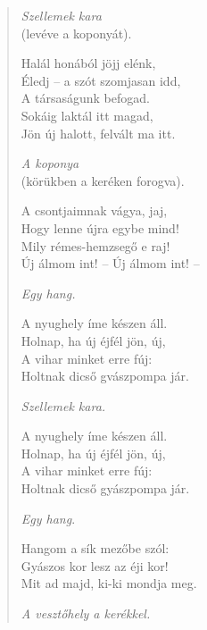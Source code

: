 \begin{verse}
\smallskip

\textit{Szellemek kara }\\
(levéve a koponyát).

\smallskip

\frqq Halál honából jöjj elénk, \\
Éledj -- a szót szomjasan idd, \\
A társaságunk befogad. \\
Sokáig laktál itt magad, \\
Jön új halott, felvált ma itt. \flqq

\smallskip

\textit{A koponya} \\
(körükben a keréken forogva).

\smallskip

\frqq A csontjaimnak vágya, jaj, \\
Hogy lenne újra egybe mind! \\
Mily rémes-hemzsegő e raj! \\
Új álmom int! -- Új álmom int! -- \flqq

\smallskip

\textit{Egy hang.}

\smallskip

\frqq A nyughely íme készen áll. \\
Holnap, ha új éjfél jön, új, \\
A vihar minket erre fúj: \\
Holtnak dicső gvászpompa jár. \flqq

\smallskip

\textit{Szellemek kara.}

\smallskip

\frqq A nyughely íme készen áll. \\
Holnap, ha új éjfél jön, új, \\
A vihar minket erre fúj: \\
Holtnak dicső gyászpompa jár. \flqq

\smallskip

\textit{Egy hang}.

\smallskip

\frqq Hangom a sík mezőbe szól: \\
Gyászos kor lesz az éji kor! \\
Mit ad majd, ki-ki mondja meg. \flqq

\smallskip

\textit{A vesztőhely a kerékkel.}

\smallskip


\end{verse}
